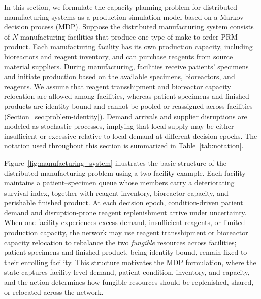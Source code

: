 \documentclass[preprint,review,12pt,nonatbib]{elsarticle}
\providecommand{\DIFadd}[1]{{\protect\color{blue}#1}} %
\providecommand{\DIFdel}[1]{} %
\providecommand{\DIFaddbegin}{} %
\providecommand{\DIFaddend}{} %
\providecommand{\DIFdelbegin}{} %
\providecommand{\DIFdelend}{} %
\providecommand{\DIFscaledelfig}{0.5}
\newlength{\DIFdelgraphicswidth} %
\newlength{\DIFdelgraphicsheight} %
\providecommand{\DIFaddincludegraphics}[2][]{{\color{blue}\fbox{\DIFOincludegraphics[#1]{#2}}}} %
\providecommand{\DIFdelincludegraphics}[2][]{%
\sbox{\DIFdelgraphicsbox}{\DIFOincludegraphics[#1]{#2}}%
\settoboxwidth{\DIFdelgraphicswidth}{\DIFdelgraphicsbox} %
\settoboxtotalheight{\DIFdelgraphicsheight}{\DIFdelgraphicsbox} %
\scalebox{\DIFscaledelfig}{%
\parbox[b]{\DIFdelgraphicswidth}{\usebox{\DIFdelgraphicsbox}\\[-\baselineskip] \rule{\DIFdelgraphicswidth}{0em}}\llap{\resizebox{\DIFdelgraphicswidth}{\DIFdelgraphicsheight}{%
\setlength{\unitlength}{\DIFdelgraphicswidth}%
\begin{picture}(1,1)%
\thicklines\linethickness{2pt} %
{\color[rgb]{1,0,0}\put(0,0){\framebox(1,1){}}}%
{\color[rgb]{1,0,0}\put(0,0){\line( 1,1){1}}}%
{\color[rgb]{1,0,0}\put(0,1){\line(1,-1){1}}}%
\end{picture}%
}\hspace*{3pt}}} %
} %
\DeclareRobustCommand{\DIFaddbegin}{\DIFOaddbegin \let\includegraphics\DIFaddincludegraphics} %
\DeclareRobustCommand{\DIFaddend}{\DIFOaddend \let\includegraphics\DIFOincludegraphics} %
\DeclareRobustCommand{\DIFdelbegin}{\DIFOdelbegin \let\includegraphics\DIFdelincludegraphics} %
\DeclareRobustCommand{\DIFdelend}{\DIFOaddend \let\includegraphics\DIFOincludegraphics} %
\begin{document}
In this section, we formulate the capacity planning problem for distributed manufacturing systems as a production simulation model based on a Markov decision process (MDP). Suppose the distributed manufacturing system consists of \DIFdelbegin \DIFdel{$L$ }\DIFdelend \DIFaddbegin \DIFadd{$N$ }\DIFaddend manufacturing facilities that produce one type of make-to-order PRM product. Each manufacturing facility has its own production capacity, including bioreactors and reagent inventory, and can purchase reagents from source material suppliers. During manufacturing, facilities receive patients' specimens and initiate production based on the available specimens, bioreactors, and reagents. We assume that \DIFdelbegin \DIFdel{inventory transshipment , capacity relocation , and demand sharing }\DIFdelend \DIFaddbegin \DIFadd{reagent transshipment and bioreactor capacity relocation }\DIFaddend are allowed among facilities\DIFaddbegin \DIFadd{, whereas patient specimens and finished products are identity-bound and cannot be pooled or reassigned across facilities (Section~\ref{sec:problem-identity})}\DIFaddend . Demand arrivals and supplier disruptions are modeled as stochastic processes, implying that local supply may be either insufficient or excessive relative to local demand at different decision epochs. The notation used throughout this section is summarized in Table~\ref{tab:notation}.

Figure~\ref{fig:manufacturing_system} illustrates the basic structure of the distributed manufacturing problem using a two-facility example. Each facility maintains \DIFdelbegin \DIFdel{three primary operational states: the number of patient specimens waiting for manufacturing, the available }\DIFdelend \DIFaddbegin \DIFadd{a patient--specimen queue whose members carry a deteriorating survival index, together with }\DIFaddend reagent inventory, \DIFdelbegin \DIFdel{and the available bioreactor capacity}\DIFdelend \DIFaddbegin \DIFadd{bioreactor capacity, and perishable finished product}\DIFaddend . At each decision epoch, \DIFdelbegin \DIFdel{new }\DIFdelend \DIFaddbegin \DIFadd{condition-driven }\DIFaddend patient demand and \DIFaddbegin \DIFadd{disruption-prone }\DIFaddend reagent replenishment arrive under uncertainty. When one facility experiences excess demand, insufficient reagents, or limited production capacity, the network may use \DIFdelbegin \DIFdel{demand sharing, reagent transshipment , or }\DIFdelend \DIFaddbegin \DIFadd{reagent transshipment or bioreactor }\DIFaddend capacity relocation to rebalance \DIFaddbegin \DIFadd{the two }\emph{\DIFadd{fungible}} \DIFaddend resources across facilities\DIFaddbegin \DIFadd{; patient specimens and finished product, being identity-bound, remain fixed to their enrolling facility}\DIFaddend . This structure motivates the MDP formulation, where the state captures facility-level demand, \DIFaddbegin \DIFadd{patient condition, }\DIFaddend inventory, and capacity\DIFdelbegin \DIFdel{conditions}\DIFdelend , and the action determines how \DIFaddbegin \DIFadd{fungible }\DIFaddend resources should be replenished, shared, or relocated across the network.
\end{document}
